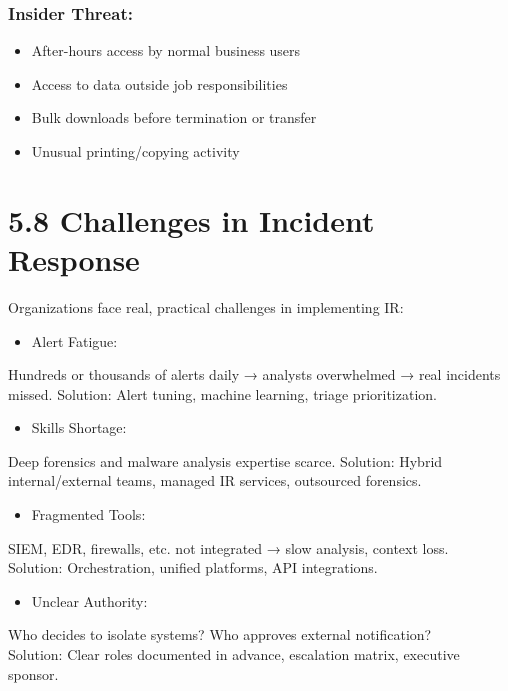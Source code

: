 \documentclass[10pt]{article}
\begin{document}
\subsubsection*{Insider Threat:}
\begin{itemize}
  \item After-hours access by normal business users
  \item Access to data outside job responsibilities
  \item Bulk downloads before termination or transfer
  \item Unusual printing/copying activity
\end{itemize}

\section*{5.8 Challenges in Incident Response}
Organizations face real, practical challenges in implementing IR:

\begin{itemize}
  \item Alert Fatigue:
\end{itemize}

Hundreds or thousands of alerts daily → analysts overwhelmed → real incidents missed. Solution: Alert tuning, machine learning, triage prioritization.

\begin{itemize}
  \item Skills Shortage:
\end{itemize}

Deep forensics and malware analysis expertise scarce. Solution: Hybrid internal/external teams, managed IR services, outsourced forensics.

\begin{itemize}
  \item Fragmented Tools:
\end{itemize}

SIEM, EDR, firewalls, etc. not integrated → slow analysis, context loss.\\
Solution: Orchestration, unified platforms, API integrations.

\begin{itemize}
  \item Unclear Authority:
\end{itemize}

Who decides to isolate systems? Who approves external notification?\\
Solution: Clear roles documented in advance, escalation matrix, executive sponsor.
\end{document}
